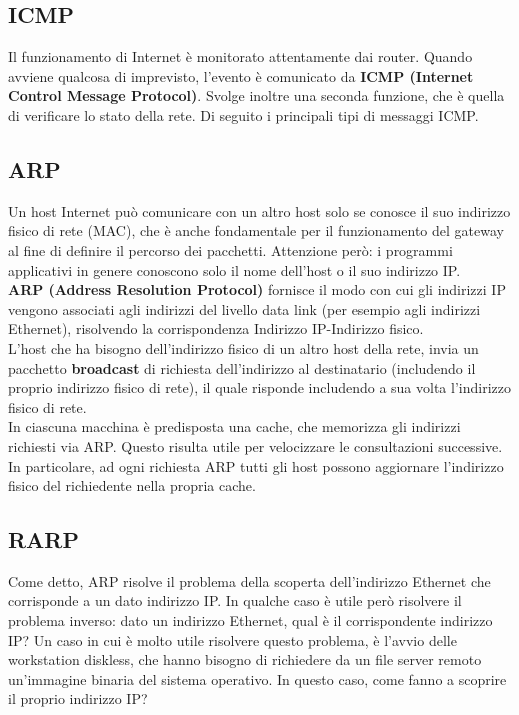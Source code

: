 \documentclass{article}
\begin{document}
        \subsection{ICMP}
        Il funzionamento di Internet è monitorato attentamente dai router. Quando avviene qualcosa
        di imprevisto, l’evento è comunicato da \textbf{ICMP (Internet Control Message Protocol)}. Svolge
        inoltre una seconda funzione, che è quella di verificare lo stato della rete. Di seguito i principali
        tipi di messaggi ICMP.


        \subsection{ARP}
        Un host Internet può comunicare con un altro host solo se conosce il suo indirizzo fisico di rete
        (MAC), che è anche fondamentale per il funzionamento del gateway al fine di definire il
        percorso dei pacchetti. Attenzione però: i programmi applicativi in genere conoscono solo il
        nome dell’host o il suo indirizzo IP.\\
        
        \textbf{ARP (Address Resolution Protocol)} fornisce il modo con cui gli indirizzi IP vengono associati
        agli indirizzi del livello data link (per esempio agli indirizzi Ethernet), risolvendo la
        corrispondenza Indirizzo IP-Indirizzo fisico.\\

        L’host che ha bisogno dell’indirizzo fisico di un altro host della rete, invia un pacchetto
        \textbf{broadcast} di richiesta dell’indirizzo al destinatario (includendo il proprio indirizzo fisico di
        rete), il quale risponde includendo a sua volta l’indirizzo fisico di rete.\\

        In ciascuna macchina è predisposta una cache, che memorizza gli indirizzi richiesti via ARP.
        Questo risulta utile per velocizzare le consultazioni successive. In particolare, ad ogni richiesta
        ARP tutti gli host possono aggiornare l’indirizzo fisico del richiedente nella propria cache.
        
        \subsection{RARP}
        Come detto, ARP risolve il problema della scoperta dell’indirizzo Ethernet che corrisponde a un
        dato indirizzo IP. In qualche caso è utile però risolvere il problema inverso: dato un indirizzo
        Ethernet, qual è il corrispondente indirizzo IP? Un caso in cui è molto utile risolvere questo
        problema, è l’avvio delle workstation diskless, che hanno bisogno di richiedere da un file server
        remoto un’immagine binaria del sistema operativo. In questo caso, come fanno a scoprire il
        proprio indirizzo IP?\\
        
\end{document}
